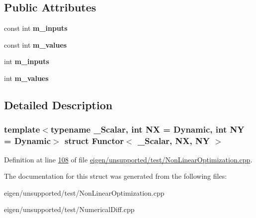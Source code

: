 \subsection*{Public Attributes}
\begin{DoxyCompactItemize}
\item 
\mbox{\label{struct_functor_a86b97d099c68afa31fb6bce8e1c73392}} 
const int {\bfseries m\+\_\+inputs}
\item 
\mbox{\label{struct_functor_a43ff0ecbd037627beca75d0994159e7e}} 
const int {\bfseries m\+\_\+values}
\item 
\mbox{\label{struct_functor_a86b97d099c68afa31fb6bce8e1c73392}} 
int {\bfseries m\+\_\+inputs}
\item 
\mbox{\label{struct_functor_a43ff0ecbd037627beca75d0994159e7e}} 
int {\bfseries m\+\_\+values}
\end{DoxyCompactItemize}


\subsection{Detailed Description}
\subsubsection*{template$<$typename \+\_\+\+Scalar, int NX = Dynamic, int NY = Dynamic$>$\newline
struct Functor$<$ \+\_\+\+Scalar, N\+X, N\+Y $>$}



Definition at line \hyperlink{eigen_2unsupported_2test_2_non_linear_optimization_8cpp_source_l00108}{108} of file \hyperlink{eigen_2unsupported_2test_2_non_linear_optimization_8cpp_source}{eigen/unsupported/test/\+Non\+Linear\+Optimization.\+cpp}.



The documentation for this struct was generated from the following files\+:\begin{DoxyCompactItemize}
\item 
eigen/unsupported/test/\+Non\+Linear\+Optimization.\+cpp\item 
eigen/unsupported/test/\+Numerical\+Diff.\+cpp\end{DoxyCompactItemize}

